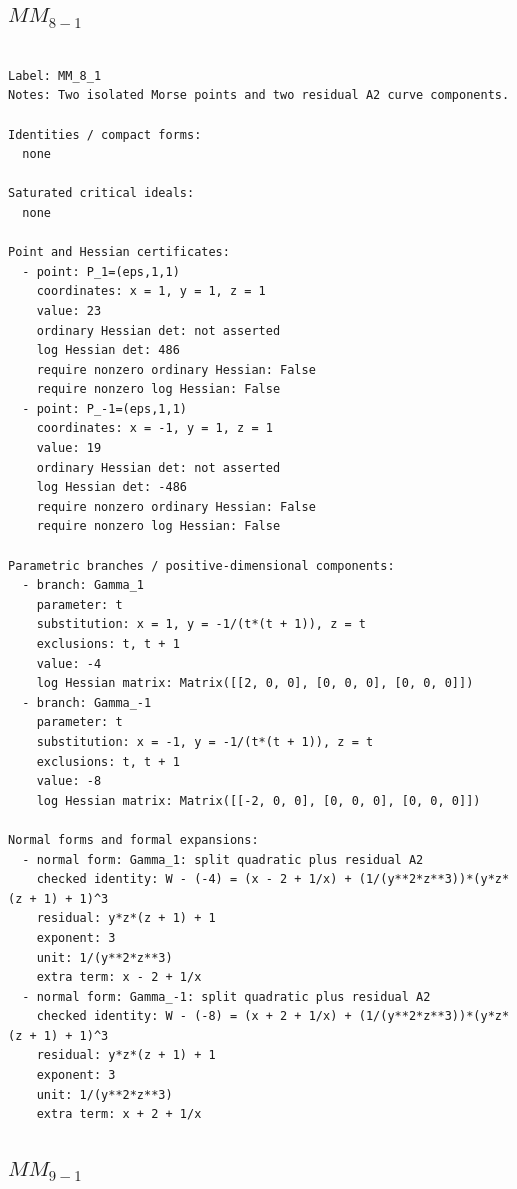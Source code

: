 \documentclass[10pt,a4paper]{article}
\begin{document}
\subsection*{$ MM_{8-1} $}

\begin{lstlisting}

Label: MM_8_1
Notes: Two isolated Morse points and two residual A2 curve components.

Identities / compact forms:
  none

Saturated critical ideals:
  none

Point and Hessian certificates:
  - point: P_1=(eps,1,1)
    coordinates: x = 1, y = 1, z = 1
    value: 23
    ordinary Hessian det: not asserted
    log Hessian det: 486
    require nonzero ordinary Hessian: False
    require nonzero log Hessian: False
  - point: P_-1=(eps,1,1)
    coordinates: x = -1, y = 1, z = 1
    value: 19
    ordinary Hessian det: not asserted
    log Hessian det: -486
    require nonzero ordinary Hessian: False
    require nonzero log Hessian: False

Parametric branches / positive-dimensional components:
  - branch: Gamma_1
    parameter: t
    substitution: x = 1, y = -1/(t*(t + 1)), z = t
    exclusions: t, t + 1
    value: -4
    log Hessian matrix: Matrix([[2, 0, 0], [0, 0, 0], [0, 0, 0]])
  - branch: Gamma_-1
    parameter: t
    substitution: x = -1, y = -1/(t*(t + 1)), z = t
    exclusions: t, t + 1
    value: -8
    log Hessian matrix: Matrix([[-2, 0, 0], [0, 0, 0], [0, 0, 0]])

Normal forms and formal expansions:
  - normal form: Gamma_1: split quadratic plus residual A2
    checked identity: W - (-4) = (x - 2 + 1/x) + (1/(y**2*z**3))*(y*z*(z + 1) + 1)^3
    residual: y*z*(z + 1) + 1
    exponent: 3
    unit: 1/(y**2*z**3)
    extra term: x - 2 + 1/x
  - normal form: Gamma_-1: split quadratic plus residual A2
    checked identity: W - (-8) = (x + 2 + 1/x) + (1/(y**2*z**3))*(y*z*(z + 1) + 1)^3
    residual: y*z*(z + 1) + 1
    exponent: 3
    unit: 1/(y**2*z**3)
    extra term: x + 2 + 1/x

\end{lstlisting}

\subsection*{$ MM_{9-1} $}
\end{document}
